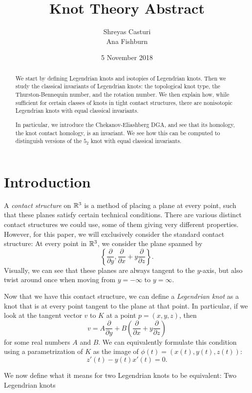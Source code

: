 \documentclass{article}
\title{Knot Theory Abstract}
\author{Shreyas Casturi\\Ana Fishburn}
\date{5 November 2018}
\begin{document}
\maketitle

\begin{abstract}
We start by defining Legendrian knots and isotopies of Legendrian knots.
Then we study the classical invariants of Legendrian knots:
the topological knot type, the Thurston-Bennequin number, and the rotation number.
We then explain how, while sufficient for certain classes of knots in tight
contact structures, there are nonisotopic Legendrian knots with equal
classical invariants.

In particular, we introduce the Chekanov-Eliashberg DGA, and see that its
homology, the knot contact homology, is an invariant. We see how this
can be computed to distinguish versions of the $5_2$ knot with equal classical
invariants.
\end{abstract}

\section{Introduction}
A {\it contact structure} on $\mathbb{R}^3$ is a method of placing a plane at every point,
such that these planes satisfy certain technical conditions.
There are various distinct contact structures we could use, some of them giving
very different properties.
However, for this paper, we will exclusively consider the standard contact structure:
At every point in $\mathbb{R}^3$, we consider the plane spanned by
\[\left\{\frac{\partial}{\partial y},\frac{\partial}{\partial x} + y\frac{\partial}{\partial z}\right\}.\]
Visually, we can see that these planes are always tangent to the $y$-axis, but also
twist around once when moving from $y = -\infty$ to $y = \infty$.

Now that we have this contact structure, we can define a {\it Legendrian knot}
as a knot that is at every point tangent to the plane at that point.
In particular, if we look at the tangent vector $v$ to $K$ at a point $p = (x,y,z)$,
then
\[ v = A\frac{\partial}{\partial y} + B\left(\frac{\partial}{\partial x} +y\frac{\partial}{\partial z}\right)\]
for some real numbers $A$ and $B$.
We can equivalently formulate this condition using a parametrization of $K$ as
the image of $\phi(t) = (x(t),y(t),z(t))$:
\[ z'(t)-y(t)x'(t) = 0.\]

We now define what it means for two Legendrian knots to be equivalent:
Two Legendrian knots
\end{document}
